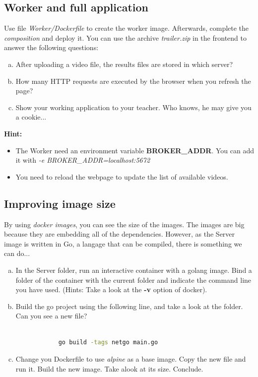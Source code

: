\documentclass[a4paper,11pt]{exam}
\begin{document}
\subsection{Worker and full application}
	\begin{questions}
	
	\question Use file \textit{Worker/Dockerfile} to create the worker image. Afterwards, complete the \textit{composition} and deploy it. You can use the archive \textit{trailer.zip} in the frontend to answer the following questions:
	
	\begin{enumerate}[(a)] %
		\item After uploading a video file, the results files are stored in which server? 
		\item How many HTTP requests are executed by the browser when you refresh the page?
		\item Show your working application to your teacher. Who knows, he may give you a cookie... 
	\end{enumerate}
	
	\textbf{Hint:}
	\begin{itemize}
	\item The Worker need an environment variable \textbf{BROKER\_ADDR}. You can add it with \textit{-e BROKER\_ADDR=localhost:5672}
	\item You need to reload the webpage to update the list of available videos. 
	\end{itemize}
	\end{questions}


\subsection{Improving image size}	
	\begin{questions}

	\question By using \textit{docker images}, you can see the size of the images. The images are big because they are embedding all of the dependencies. However, as the Server image is written in Go, a langage that can be compiled, there is something we can do...
	
	\begin{enumerate}[(a)] %
		\item In the Server folder, run an interactive container with a golang image. Bind a folder of the container with the current folder and indicate the command line you have used. (Hints: Take a look at the \textbf{-v} option of docker).
		\item Build the go project using the following line, and take a look at the folder. Can you see a new file?

		\begin{lstlisting}[frame=single,language={sh}]  % Start your code-block

			go build -tags netgo main.go

		\end{lstlisting}
		\item Change you Dockerfile to use \textit{alpine} as a base image. Copy the new file and run it. Build the new image. Take alook at its size. Conclude. 
	\end{enumerate}
\end{questions}
\end{document}
